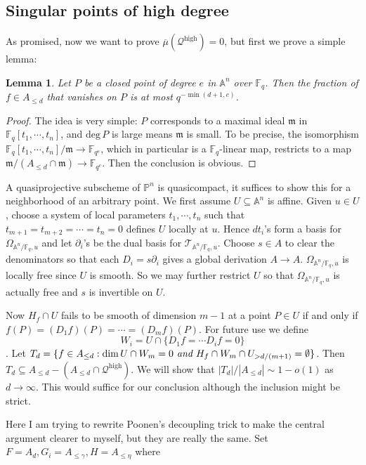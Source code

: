 \documentclass[12pt]{article}
\theoremstyle{plain}
\newtheorem{lemma}[equation]{Lemma}
\theoremstyle{definition}
\newcommand{\fm}{\mathfrak{m}}
\newcommand{\IA}{\mathbb{A}}
\newcommand{\IF}{\mathbb{F}}
\newcommand{\IP}{\mathbb{P}}
\newcommand{\sT}{\mathcal{T}}
\renewcommand{\deg}{\mathrm{deg}\,}
\renewcommand\dim{{\rm dim\,}}
\newcommand{\<}{\langle}
\renewcommand{\>}{\rangle}
\newcommand{\p}{\partial}
\newcommand{\Ohm}{\Omega}
\newcommand{\Qhigh}{\mathcal{Q}^\mathrm{high}}
\newcommand{\uppermu}{\overline{\mu}}
\begin{document}
\subsection{Singular points of high degree}
As promised, now we want to prove $\uppermu(\Qhigh) = 0$, but first we prove a simple lemma:
\begin{lemma}
Let $P$ be a closed point of degree $e$ in $\IA^n$ over $\IF_q$. Then the fraction of $f \in A_{\le d}$ that vanishes on $P$ is at most $q^{-\min(d+1, e)}$. 
\end{lemma}
\begin{proof}
The idea is very simple: $P$ corresponds to a maximal ideal $\fm$ in $\IF_q[t_1, \cdots, t_n]$, and $\deg P$ is large means $\fm$ is small. To be precise, the isomorphism $\IF_q[t_1, \cdots, t_n]/\fm \to \IF_{q^e}$, which in particular is a $\IF_q$-linear map, restricts to a map $\fm/(A_{\le d} \cap \fm) \to \IF_{q^e}$. Then the conclusion is obvious. 
\end{proof}
\par A quasiprojective subscheme of $\IP^n$ is quasicompact, it suffices to show this for a neighborhood of an arbitrary point. We first assume $U \subseteq \IA^n$ is affine. Given $u \in U$, choose a system of local parameters $t_1, \cdots, t_n$ such that $t_{m+1} = t_{m+2} = \cdots = t_n = 0$ defines $U$ locally at $u$. Hence $dt_i$'s form a basis for $\Ohm_{\IA^n/\IF_q, u}$ and let $\p_i $'s be the dual basis for $\sT_{\IA^n/\IF_q, u}$. Choose $s \in A$ to clear the denominators so that each $D_i = s\p_i$ gives a global derivation $A \to A$. $\Ohm_{\IA^n/\IF_q, u}$ is locally free since $U$ is smooth. So we may further restrict $U$ so that $\Ohm_{\IA^n/\IF_q, u}$ is actually free and $s$ is invertible on $U$. 
\par Now $H_f \cap U$ fails to be smooth of dimension $m - 1$ at a point $P \in U$ if and only if $f(P) = (D_1 f)(P) = \cdots = (D_m f)(P)$. For future use we define $$W_i = U \cap \{ D_1 f = \cdots D_i f = 0 \}$$. Let $T_d = \{ f \in A_{\le d} : \dim U \cap W_m = 0 \textit{ and } H_f \cap W_m \cap U_{> d/(m+1)} = \emptyset\}$. Then $T_d \subseteq A_{\le d} - (A_{\le d} \cap \Qhigh)$. We will show that $|T_d|/|A_{\le d}| \sim 1 - o(1)$ as $d \to \infty$. This would suffice for our conclusion although the inclusion might be strict. 
\par Here I am trying to rewrite Poonen's decoupling trick to make the central argument clearer to myself, but they are really the same. Set $F = A_{d}, G_i = A_{\le \gamma}, H = A_{\le \eta}$ where 
\end{document}
